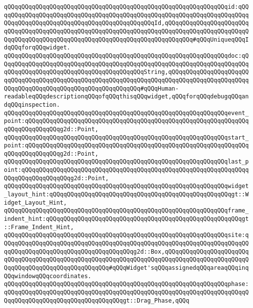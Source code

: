 \verb|qQQqqQQqqQQqqQQqqQQqqQQqqQQqqQQqqQQqqQQqqQQqqQQqqQQqqQQqqQQqqQQqid:qQQqqQQqqQQqqQQqqQQqqQQqqQQqqQQqqQQqqQQqqQQqqQQqqQQqqQQqqQQqqQQqqQQqqQQqqQQqqQQqqQQqqQQqqQQqqQQqqQQqqQQqqQQqqQQqqQQqId,qQQqqQQqqQQqqQQqqQQqqQQqqQQqqQQqqQQqqQQqqQQqqQQqqQQqqQQqqQQqqQQqqQQqqQQqqQQqqQQqqQQqqQQqqQQqqQQqqQQqqQQqqQQqqQQqqQQqqQQqqQQqqQQqqQQqqQQqqQQqqQQqqQQq#qQQqUniqueqQQqIdqQQqforqQQqwidget.|\newline
\verb|qQQqqQQqqQQqqQQqqQQqqQQqqQQqqQQqqQQqqQQqqQQqqQQqqQQqqQQqqQQqqQQqdoc:qQQqqQQqqQQqqQQqqQQqqQQqqQQqqQQqqQQqqQQqqQQqqQQqqQQqqQQqqQQqqQQqqQQqqQQqqQQqqQQqqQQqqQQqqQQqqQQqqQQqqQQqqQQqqQQqString,qQQqqQQqqQQqqQQqqQQqqQQqqQQqqQQqqQQqqQQqqQQqqQQqqQQqqQQqqQQqqQQqqQQqqQQqqQQqqQQqqQQqqQQqqQQqqQQqqQQqqQQqqQQqqQQqqQQqqQQqqQQqqQQqqQQq#qQQqHuman-readableqQQqdescriptionqQQqofqQQqthisqQQqwidget,qQQqforqQQqdebugqQQqandqQQqinspection.|\newline
\verb|qQQqqQQqqQQqqQQqqQQqqQQqqQQqqQQqqQQqqQQqqQQqqQQqqQQqqQQqqQQqqQQqevent_point:qQQqqQQqqQQqqQQqqQQqqQQqqQQqqQQqqQQqqQQqqQQqqQQqqQQqqQQqqQQqqQQqqQQqqQQqqQQqqQQqg2d::Point,|\newline
\verb|qQQqqQQqqQQqqQQqqQQqqQQqqQQqqQQqqQQqqQQqqQQqqQQqqQQqqQQqqQQqqQQqstart_point:qQQqqQQqqQQqqQQqqQQqqQQqqQQqqQQqqQQqqQQqqQQqqQQqqQQqqQQqqQQqqQQqqQQqqQQqqQQqqQQqg2d::Point,|\newline
\verb|qQQqqQQqqQQqqQQqqQQqqQQqqQQqqQQqqQQqqQQqqQQqqQQqqQQqqQQqqQQqqQQqlast_point:qQQqqQQqqQQqqQQqqQQqqQQqqQQqqQQqqQQqqQQqqQQqqQQqqQQqqQQqqQQqqQQqqQQqqQQqqQQqqQQqqQQqg2d::Point,|\newline
\verb|qQQqqQQqqQQqqQQqqQQqqQQqqQQqqQQqqQQqqQQqqQQqqQQqqQQqqQQqqQQqqQQqwidget_layout_hint:qQQqqQQqqQQqqQQqqQQqqQQqqQQqqQQqqQQqqQQqqQQqqQQqqQQqgt::Widget_Layout_Hint,|\newline
\verb|qQQqqQQqqQQqqQQqqQQqqQQqqQQqqQQqqQQqqQQqqQQqqQQqqQQqqQQqqQQqqQQqframe_indent_hint:qQQqqQQqqQQqqQQqqQQqqQQqqQQqqQQqqQQqqQQqqQQqqQQqqQQqqQQqgt::Frame_Indent_Hint,|\newline
\verb|qQQqqQQqqQQqqQQqqQQqqQQqqQQqqQQqqQQqqQQqqQQqqQQqqQQqqQQqqQQqqQQqsite:qQQqqQQqqQQqqQQqqQQqqQQqqQQqqQQqqQQqqQQqqQQqqQQqqQQqqQQqqQQqqQQqqQQqqQQqqQQqqQQqqQQqqQQqqQQqqQQqqQQqqQQqqQQqg2d::Box,qQQqqQQqqQQqqQQqqQQqqQQqqQQqqQQqqQQqqQQqqQQqqQQqqQQqqQQqqQQqqQQqqQQqqQQqqQQqqQQqqQQqqQQqqQQqqQQqqQQqqQQqqQQqqQQqqQQqqQQqqQQq#qQQqWidget'sqQQqassignedqQQqareaqQQqinqQQqwindowqQQqcoordinates.|\newline
\verb|qQQqqQQqqQQqqQQqqQQqqQQqqQQqqQQqqQQqqQQqqQQqqQQqqQQqqQQqqQQqqQQqphase:qQQqqQQqqQQqqQQqqQQqqQQqqQQqqQQqqQQqqQQqqQQqqQQqqQQqqQQqqQQqqQQqqQQqqQQqqQQqqQQqqQQqqQQqqQQqqQQqqQQqqQQqgt::Drag_Phase,qQQq|\newline
